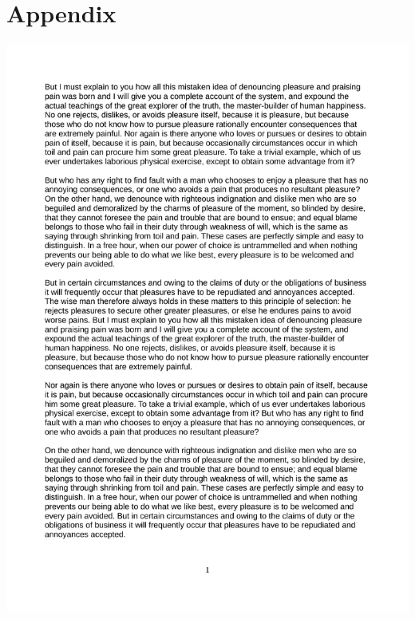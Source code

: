 \appendix
\section{Appendix} \label{app:example-text}

\begin{center} %
	\includegraphics[trim = 0mm 0mm 0mm 0mm,clip, page = 1, width=1\textwidth]{Data/Example_Text.pdf}\\
\end{center}

